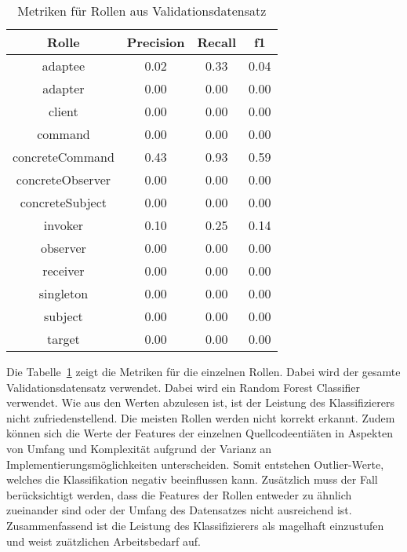 \begin{table}[H]
    \caption{Metriken für Rollen aus Validationsdatensatz}
    \label{tab:classifier_metrics}
    \begin{tabular}{|c|c|c|c|}
        \hline
         Rolle & Precision & Recall & f1\\
        \hline
        adaptee & 0.02 & 0.33 & 0.04\\adapter & 0.00 & 0.00 & 0.00\\client & 0.00 & 0.00 & 0.00\\command & 0.00 & 0.00 & 0.00\\concreteCommand & 0.43 & 0.93 & 0.59\\concreteObserver & 0.00 & 0.00 & 0.00\\concreteSubject & 0.00 & 0.00 & 0.00\\invoker & 0.10 & 0.25 & 0.14\\observer & 0.00 & 0.00 & 0.00\\receiver & 0.00 & 0.00 & 0.00\\singleton & 0.00 & 0.00 & 0.00\\subject & 0.00 & 0.00 & 0.00\\target & 0.00 & 0.00 & 0.00\\
        \hline
        \end{tabular}
\end{table}

Die Tabelle~\ref{tab:classifier_metrics} zeigt die Metriken für die einzelnen Rollen. Dabei wird der gesamte Validationsdatensatz verwendet.
Dabei wird ein Random Forest Classifier verwendet. Wie aus den Werten abzulesen ist, ist der Leistung des Klassifizierers nicht zufriedenstellend. Die meisten Rollen werden nicht korrekt erkannt. 
Zudem können sich die Werte der Features der einzelnen Quellcodeentiäten in Aspekten von Umfang und Komplexität aufgrund der Varianz an Implementierungsmöglichkeiten unterscheiden. Somit entstehen Outlier-Werte, welches die Klassifikation negativ beeinflussen kann.
Zusätzlich muss der Fall berücksichtigt werden, dass die Features der Rollen entweder zu ähnlich zueinander sind oder der Umfang des Datensatzes nicht ausreichend ist.
Zusammenfassend ist die Leistung des Klassifizierers als magelhaft einzustufen und weist zuätzlichen Arbeitsbedarf auf.












